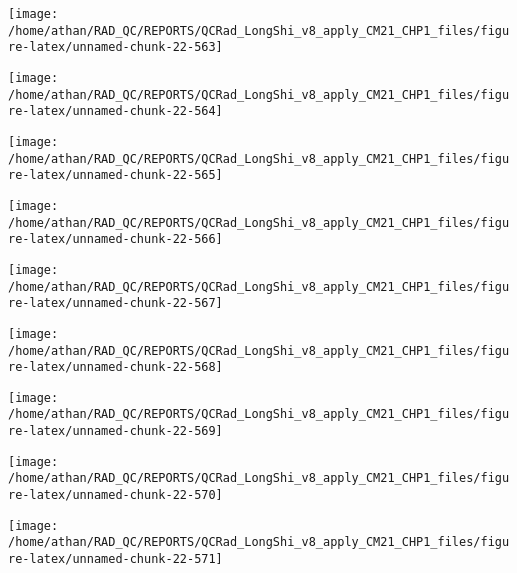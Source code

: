 \documentclass[
  10pt,
  a4paper,oneside]{article}
\begin{document}
\begin{center}\texttt{[image: /home/athan/RAD\_QC/REPORTS/QCRad\_LongShi\_v8\_apply\_CM21\_CHP1\_files/figure-latex/unnamed-chunk-22-563]} \end{center}

\begin{center}\texttt{[image: /home/athan/RAD\_QC/REPORTS/QCRad\_LongShi\_v8\_apply\_CM21\_CHP1\_files/figure-latex/unnamed-chunk-22-564]} \end{center}

\begin{center}\texttt{[image: /home/athan/RAD\_QC/REPORTS/QCRad\_LongShi\_v8\_apply\_CM21\_CHP1\_files/figure-latex/unnamed-chunk-22-565]} \end{center}

\begin{center}\texttt{[image: /home/athan/RAD\_QC/REPORTS/QCRad\_LongShi\_v8\_apply\_CM21\_CHP1\_files/figure-latex/unnamed-chunk-22-566]} \end{center}

\begin{center}\texttt{[image: /home/athan/RAD\_QC/REPORTS/QCRad\_LongShi\_v8\_apply\_CM21\_CHP1\_files/figure-latex/unnamed-chunk-22-567]} \end{center}

\begin{center}\texttt{[image: /home/athan/RAD\_QC/REPORTS/QCRad\_LongShi\_v8\_apply\_CM21\_CHP1\_files/figure-latex/unnamed-chunk-22-568]} \end{center}

\begin{center}\texttt{[image: /home/athan/RAD\_QC/REPORTS/QCRad\_LongShi\_v8\_apply\_CM21\_CHP1\_files/figure-latex/unnamed-chunk-22-569]} \end{center}

\begin{center}\texttt{[image: /home/athan/RAD\_QC/REPORTS/QCRad\_LongShi\_v8\_apply\_CM21\_CHP1\_files/figure-latex/unnamed-chunk-22-570]} \end{center}

\begin{center}\texttt{[image: /home/athan/RAD\_QC/REPORTS/QCRad\_LongShi\_v8\_apply\_CM21\_CHP1\_files/figure-latex/unnamed-chunk-22-571]} \end{center}
\end{document}
